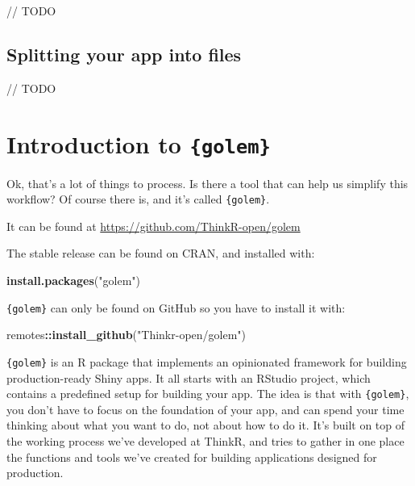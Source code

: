 \documentclass[]{book}
\newenvironment{Shaded}{\begin{snugshade}}{\end{snugshade}}
\newcommand{\KeywordTok}[1]{\textcolor[rgb]{0.13,0.29,0.53}{\textbf{#1}}}
\newcommand{\NormalTok}[1]{#1}
\newcommand{\OperatorTok}[1]{\textcolor[rgb]{0.81,0.36,0.00}{\textbf{#1}}}
\newcommand{\StringTok}[1]{\textcolor[rgb]{0.31,0.60,0.02}{#1}}
\begin{document}
// TODO

\hypertarget{splitting-your-app-into-files}{%
\section{Splitting your app into files}\label{splitting-your-app-into-files}}

// TODO

\hypertarget{golem}{%
\chapter{\texorpdfstring{Introduction to \texttt{\{golem\}}}{Introduction to \{golem\}}}\label{golem}}

Ok, that's a lot of things to process. Is there a tool that can help us simplify this workflow? Of course there is, and it's called \texttt{\{golem\}}.

It can be found at \url{https://github.com/ThinkR-open/golem}

The stable release can be found on CRAN, and installed with:

\begin{Shaded}
\begin{Highlighting}[]
\KeywordTok{install.packages}\NormalTok{(}\StringTok{"golem"}\NormalTok{)}
\end{Highlighting}
\end{Shaded}

\texttt{\{golem\}} can only be found on GitHub so you have to install it with:

\begin{Shaded}
\begin{Highlighting}[]
\NormalTok{remotes}\OperatorTok{::}\KeywordTok{install_github}\NormalTok{(}\StringTok{"Thinkr-open/golem"}\NormalTok{)}
\end{Highlighting}
\end{Shaded}

\texttt{\{golem\}} is an R package that implements an opinionated framework for building production-ready Shiny apps. It all starts with an RStudio project, which contains a predefined setup for building your app. The idea is that with \texttt{\{golem\}}, you don't have to focus on the foundation of your app, and can spend your time thinking about what you want to do, not about how to do it. It's built on top of the working process we've developed at ThinkR, and tries to gather in one place the functions and tools we've created for building applications designed for production.
\end{document}
